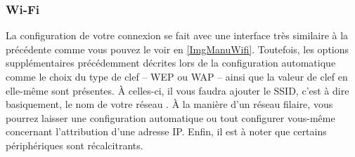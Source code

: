 {\subsubsection{Wi-Fi}
La configuration de votre connexion  se fait avec une interface très similaire à la précédente comme vous pouvez le voir en \ref{ImgManuWifi}. Toutefois, les options supplémentaires précédemment décrites lors de la configuration automatique comme le choix du type de clef -- WEP ou WAP -- ainsi que la valeur de clef en elle-même sont présentes. À celles-ci, il vous faudra ajouter le SSID, c'est à dire basiquement, le nom de votre réseau . À la manière d'un réseau filaire, vous pourrez laisser une configuration automatique ou tout configurer vous-même concernant l'attribution d'une adresse IP. Enfin, il est à noter que certains périphériques  sont récalcitrants.
\GestionReseauManuel
}
